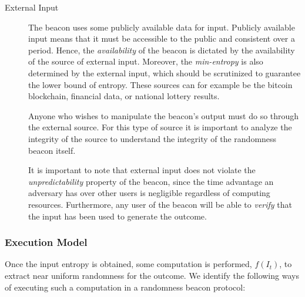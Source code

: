 \begin{description}
    \item[External Input]
        The beacon uses some publicly available data for input.
        Publicly available input means that it must be accessible to the public and consistent over a period.
        Hence, the \emph{availability} of the beacon is dictated by the availability of the source of external input.
        Moreover, the \emph{min-entropy} is also determined by the external input, which should be scrutinized to guarantee the lower bound of entropy.
        These sources can for example be the bitcoin blockchain, financial data, or national lottery results.

        Anyone who wishes to manipulate the beacon's output must do so through the external source.
        For this type of source it is important to analyze the integrity of the source to understand the integrity of the randomness beacon itself.

        It is important to note that external input does not violate the \emph{unpredictability} property of the beacon, since the time advantage an adversary has over other users is negligible regardless of computing resources.
        Furthermore, any user of the beacon will be able to \emph{verify} that the input has been used to generate the outcome.

\end{description}

\subsubsection{Execution Model}
Once the input entropy is obtained, some computation is performed, $f(I_t)$, to extract near uniform randomness for the outcome.
We identify the following ways of executing such a computation in a randomness beacon protocol:

